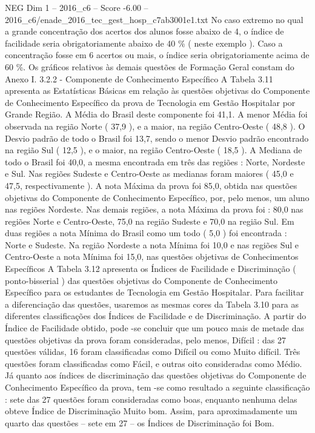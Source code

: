 \begin{textsample}{NEG Dim 1 – 2016\_c6 – Score -6.00 – 2016\_c6/enade\_2016\_tec\_gest\_hosp\_c7ab3001e1.txt}
No caso extremo no qual a grande concentração dos acertos dos alunos fosse abaixo de 4, o índice de facilidade seria obrigatoriamente abaixo de 40 \% ( neste exemplo ).
Caso a concentração fosse em 6 acertos ou mais, o índice seria obrigatoriamente acima de 60 \%.
Os gráficos relativos às demais questões de Formação Geral constam do Anexo I. 3.2.2 - Componente de Conhecimento Específico A Tabela 3.11 apresenta as Estatísticas Básicas em relação às questões objetivas do Componente de Conhecimento Específico da prova de Tecnologia em Gestão Hospitalar por Grande Região.
A Média do Brasil deste componente foi 41,1.
A menor Média foi observada na região Norte ( 37,9 ), e a maior, na região Centro-Oeste ( 48,8 ).
O Desvio padrão de todo o Brasil foi 13,7, sendo o menor Desvio padrão encontrado na região Sul ( 12,5 ), e o maior, na região Centro-Oeste ( 18,5 ).
A Mediana de todo o Brasil foi 40,0, a mesma encontrada em três das regiões : Norte, Nordeste e Sul.
Nas regiões Sudeste e Centro-Oeste as medianas foram maiores ( 45,0 e 47,5, respectivamente ).
A nota Máxima da prova foi 85,0, obtida nas questões objetivas do Componente de Conhecimento Específico, por, pelo menos, um aluno nas regiões Nordeste.
Nas demais regiões, a nota Máxima da prova foi : 80,0 nas regiões Norte e Centro-Oeste, 75,0 na região Sudeste e 70,0 na região Sul.
Em duas regiões a nota Mínima do Brasil como um todo ( 5,0 ) foi encontrada : Norte e Sudeste.
Na região Nordeste a nota Mínima foi 10,0 e nas regiões Sul e Centro-Oeste a nota Mínima foi 15,0, nas questões objetivas de Conhecimentos Específicos A Tabela 3.12 apresenta os Índices de Facilidade e Discriminação ( ponto-bisserial ) das questões objetivas do Componente de Conhecimento Específico para os estudantes de Tecnologia em Gestão Hospitalar.
Para facilitar a diferenciação das questões, usaremos as mesmas cores da Tabela 3.10 para as diferentes classificações dos Índices de Facilidade e de Discriminação.
A partir do Índice de Facilidade obtido, pode -se concluir que um pouco mais de metade das questões objetivas da prova foram consideradas, pelo menos, Difícil : das 27 questões válidas, 16 foram classificadas como Difícil ou como Muito difícil.
Três questões foram classificadas como Fácil, e outras oito consideradas como Médio.
Já quanto aos índices de discriminação das questões objetivas do Componente de Conhecimento Específico da prova, tem -se como resultado a seguinte classificação : sete das 27 questões foram consideradas como boas, enquanto nenhuma delas obteve Índice de Discriminação Muito bom.
Assim, para aproximadamente um quarto das questões – sete em 27 – os Índices de Discriminação foi Bom.

\end{textsample}
